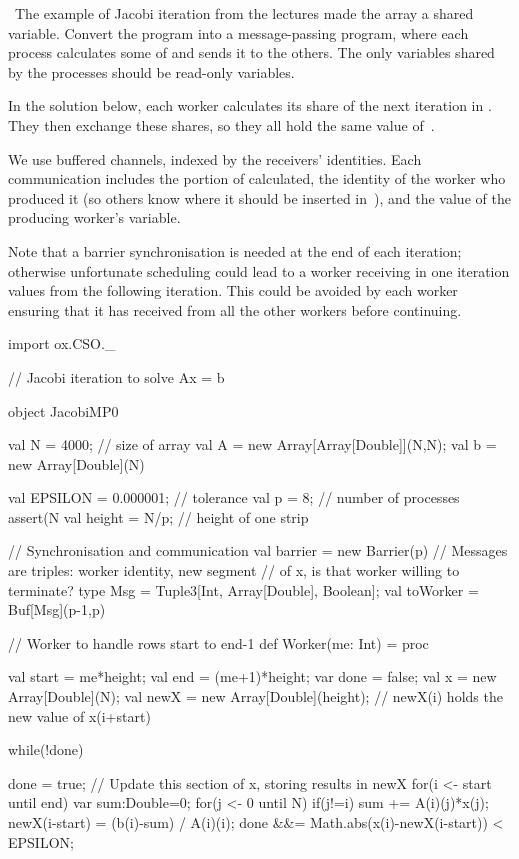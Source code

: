 \begin{question}
\Programming\
The example of Jacobi iteration from the lectures made the array  a
shared variable.  Convert the program into a message-passing program, where
each process calculates some of \SCALA{x} and sends it to the others.  The
only variables shared by the processes should be read-only variables.
\end{question}


\begin{answer}
In the solution below, each worker calculates its share of the next iteration
in \SCALA{newX}.  They then exchange these shares, so they all hold the same
value of~.

We use buffered channels, indexed by the receivers' identities.  Each
communication includes the portion of  calculated, the identity of
the worker who produced it (so others know where it should be inserted
in~\SCALA{x}), and the value of the producing worker's \SCALA{done} variable.

Note that a barrier synchronisation is needed at the end of each iteration;
otherwise unfortunate scheduling could lead to a worker receiving in one
iteration values from the following iteration.  This could be avoided by each
worker ensuring that it has received from all the other workers before
continuing. 
%
\begin{scala}
import ox.CSO._

// Jacobi iteration to solve Ax = b

object JacobiMP0{
  val N = 4000; // size of array
  val A = new Array[Array[Double]](N,N);
  val b =  new Array[Double](N)

  val EPSILON = 0.000001; // tolerance
  val p = 8; // number of processes
  assert(N%
  val height = N/p; // height of one strip

  // Synchronisation and communication
  val barrier = new Barrier(p)
  // Messages are triples: worker identity, new segment
  // of x, is that worker willing to terminate?
  type Msg = Tuple3[Int, Array[Double], Boolean];
  val toWorker = Buf[Msg](p-1,p)

  // Worker to handle rows start to end-1
  def Worker(me: Int) = proc{
    val start = me*height; val end = (me+1)*height;
    var done = false;
    val x = new Array[Double](N);
    val newX = new Array[Double](height); 
    // newX(i) holds the new value of x(i+start)

    while(!done){
      done = true; 
      // Update this section of x, storing results in newX
      for(i <- start until end){
	var sum:Double=0;
	for(j <- 0 until N) if(j!=i) sum += A(i)(j)*x(j);
	newX(i-start) = (b(i)-sum) / A(i)(i);
	done &&= Math.abs(x(i)-newX(i-start)) < EPSILON;
      }

}}}
\end{scala}
\end{answer}
